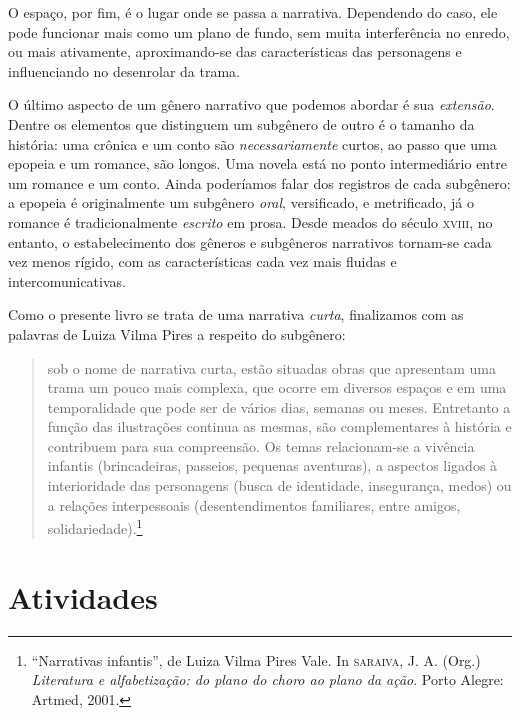 \documentclass[11pt]{extarticle}
\begin{document}
O espaço, por fim, é o lugar onde se passa a narrativa. Dependendo do caso, ele pode funcionar mais como um plano de fundo, sem muita interferência no enredo, ou mais ativamente, aproximando-se das características das personagens e influenciando no desenrolar da trama. 


O último aspecto de um gênero narrativo que podemos abordar é sua \textit{extensão}. Dentre os elementos que distinguem um subgênero de outro é o tamanho da história: uma crônica e um conto são \textit{necessariamente} curtos, ao passo que uma epopeia e um romance, são longos. Uma novela está no ponto intermediário entre um romance e um conto. Ainda poderíamos falar dos registros de cada subgênero: a epopeia é originalmente um subgênero \textit{oral}, versificado, e metrificado, já o romance é tradicionalmente \textit{escrito} em prosa.  Desde meados do século \textsc{xviii}, no entanto, o estabelecimento dos gêneros e subgêneros narrativos tornam-se cada vez menos rígido, com as características cada vez mais fluidas e intercomunicativas.

Como o presente livro se trata de uma narrativa \textit{curta}, finalizamos com as palavras de Luiza Vilma Pires a respeito do
subgênero:

\begin{quote}
sob o nome de narrativa curta, estão situadas obras que apresentam uma trama um pouco mais complexa, que ocorre em diversos espaços e em uma temporalidade que pode ser de vários dias, semanas ou meses. Entretanto a função das ilustrações continua as mesmas, são complementares à história e contribuem para sua compreensão. Os temas relacionam-se a vivência infantis (brincadeiras, passeios, pequenas aventuras), a aspectos ligados à interioridade das personagens (busca de identidade, insegurança,  
medos) ou a relações interpessoais (desentendimentos familiares, entre amigos, solidariedade).\footnote{“Narrativas infantis”, de Luiza Vilma Pires Vale. In \textsc{saraiva}, J. A. (Org.) \textit{Literatura e alfabetização: do plano do choro ao plano da ação}. Porto Alegre: Artmed, 2001.} 
\end{quote}

\section{Atividades}
\end{document}
